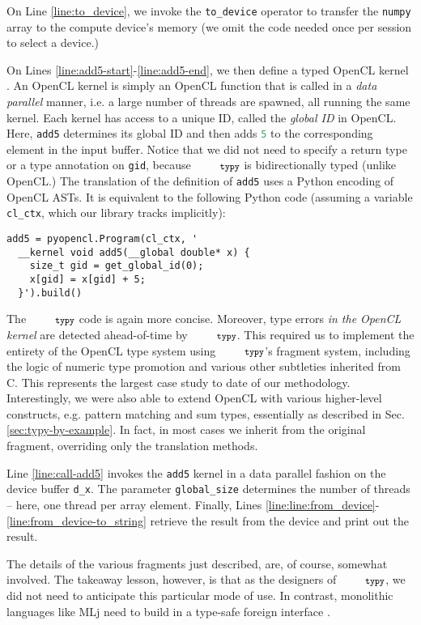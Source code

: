 \documentclass[10pt]{sigplanconf}
\newcommand{\typy}{\texttt{\footnotesize typy}}
\newcommand{\lip}[1]{\lstinline[language=Python,basicstyle=\ttfamily\footnotesize,morekeywords={with},deletendkeywords={tuple,buffer,map}]{#1}}
\newcommand{\li}[1]{\lip{#1}}
\begin{document}
On Line \ref{line:to_device}, we invoke the \li{to_device} operator to transfer the \li{numpy} array to the compute device's memory (we omit the code needed once per session to select a device.)

On Lines \ref{line:add5-start}-\ref{line:add5-end}, we then define a typed OpenCL kernel \cite{opencl11}. An OpenCL kernel is simply an OpenCL function that is called in a \emph{data parallel} manner, i.e. a large number of threads are spawned, all running the same kernel. Each kernel has access to a unique ID, called the \emph{global ID} in OpenCL. Here, \li{add5} determines its global ID and then adds \li{5} to the corresponding element in the input buffer. Notice that we did not need to specify a return type or a type annotation on \li{gid}, because $\typy$ is bidirectionally typed (unlike OpenCL.) The translation of the definition of \li{add5} uses a Python encoding of OpenCL ASTs. It is equivalent to the following Python code (assuming a variable \li{cl_ctx}, which our library tracks implicitly):
\begin{lstlisting}[numbers=none]
add5 = pyopencl.Program(cl_ctx, '
  __kernel void add5(__global double* x) {
    size_t gid = get_global_id(0);
    x[gid] = x[gid] + 5;
  }').build()
\end{lstlisting}
The $\typy$ code is again more concise. Moreover, type errors \emph{in the OpenCL kernel} are detected ahead-of-time by $\typy$. This required us to implement the entirety of the OpenCL type system using $\typy$'s fragment system, including the logic of numeric type promotion and various other subtleties inherited from C. This represents the largest case study to date of our methodology. Interestingly, we were also able to extend OpenCL with various higher-level constructs, e.g. pattern matching and sum types, essentially as described in Sec. \ref{sec:typy-by-example}. In fact, in most cases we inherit from the original fragment, overriding only the translation methods. 

Line \ref{line:call-add5} invokes the \li{add5} kernel in a data parallel fashion on the device buffer \li{d_x}. The parameter \li{global_size} determines the number of threads -- here, one thread per array element. Finally, Lines \ref{line:line:from_device}-\ref{line:from_device-to_string} retrieve the result from the device and print out the result.

The details of the various fragments just described, are, of course, somewhat involved. The takeaway lesson, however, is that as the designers of $\typy$, we did not need to anticipate this particular mode of use. 
In contrast, monolithic languages like MLj need to build in a type-safe foreign interface \cite{Benton:1999:IWW:317636.317791}. %
\end{document}
